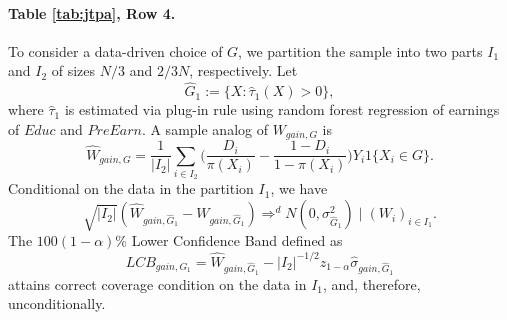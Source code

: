 \documentclass[12pt]{article}
\numberwithin{equation}{section}
\theoremstyle{plain}                         %
\theoremstyle{definition}                  %
\theoremstyle{remark}                      %
\begin{document}
\paragraph{Table \ref{tab:jtpa}, Row 4.}  To consider a data-driven choice of $G$,  we partition the sample into two parts $I_1$ and $I_2$ of sizes $N/3$ and $2/3 N$, respectively.  Let 
$$
\widehat G_1:= \{ X: \widehat \tau_1(X) >0 \},
$$
where $\widehat \tau_1$ is estimated via plug-in rule using random forest regression of earnings of $Educ$ and $PreEarn$.   A sample analog of $W_{gain,G}$ is 
$$
\widehat{W}_{gain,G}  = \dfrac{1}{| I_2| } \sum_{i \in I_2} \bigg( \dfrac{D_i}{\pi(X_i)} - \dfrac{1-D_i}{1-\pi(X_i)} \bigg) Y_i 1\{X_i \in G \}.
$$
Conditional on the data in the partition $I_1$, we have
$$
\sqrt{  | I_2| } ( \widehat{W}_{gain,\widehat G_1}  - W_{gain,\widehat G_1})  \Rightarrow^d N(0, \sigma^2_{\widehat G_1}) \mid  (W_i)_{i \in I_1}.
$$
The $100(1-\alpha)\%$ Lower Confidence Band defined as 
\begin{equation*}
{LCB}_{gain,G_1} = \widehat {W}_{gain,\widehat G_1}  - | I_2|^{-1/2} z_{1-\alpha} \widehat{\sigma}_{gain,\widehat G_1}
\end{equation*}
attains correct coverage condition on the data in $I_1$, and, therefore, unconditionally.  
\end{document}
